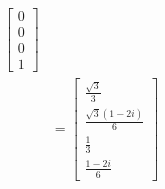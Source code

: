 \begin{align*}
\begin{bmatrix}
                         0 \\
                         0 \\
                         0 \\
                         1
                     \end{bmatrix}                                                                                                                                                                                \\
                             & = \begin{bmatrix}
                                     \frac{\sqrt{3}}{3}       \\
                                     \frac{\sqrt{3}(1-2i)}{6} \\
                                     \frac{1}{3}              \\
                                     \frac{1-2i}{6}
                                 \end{bmatrix}
\end{align*}
